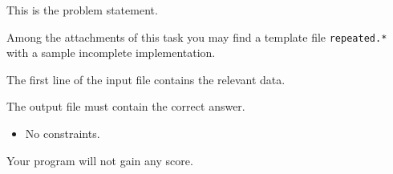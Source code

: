 \usepackage{xcolor}
\usepackage{caption}
\usepackage{afterpage}
\usepackage{pifont,mdframed}
\usepackage[bottom]{footmisc}


This is the problem statement.

\begin{warning}
    Among the attachments of this task you may find a template file \texttt{repeated.*} with a sample incomplete implementation.
\end{warning}


\InputFile

The first line of the input file contains the relevant data.


\OutputFile

The output file must contain the correct answer.


\Constraints

\begin{itemize}[nolistsep, itemsep=2mm]
    \item No constraints.
\end{itemize}

\Scoring

Your program will not gain any score.
